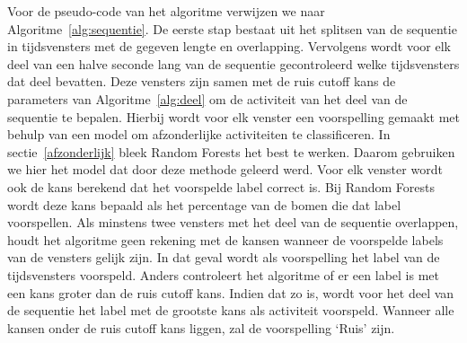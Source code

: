 \documentclass{article}
\begin{document}
Voor de pseudo-code van het algoritme verwijzen we naar Algoritme~\ref{alg:sequentie}. De eerste stap bestaat uit het splitsen van de sequentie in tijdsvensters met de gegeven lengte en overlapping. Vervolgens wordt voor elk deel van een halve seconde lang van de sequentie gecontroleerd welke tijdsvensters dat deel bevatten. Deze vensters zijn samen met de ruis cutoff kans de parameters van Algoritme~\ref{alg:deel} om de activiteit van het deel van de sequentie te bepalen. Hierbij wordt voor elk venster een voorspelling gemaakt met behulp van een model om afzonderlijke activiteiten te classificeren. In sectie~\ref{afzonderlijk} bleek Random Forests het best te werken. Daarom gebruiken we hier het model dat door deze methode geleerd werd. Voor elk venster wordt ook de kans berekend dat het voorspelde label correct is. Bij Random Forests wordt deze kans bepaald als het percentage van de bomen die dat label voorspellen.
Als minstens twee vensters met het deel van de sequentie overlappen, houdt het algoritme geen rekening met de kansen wanneer de voorspelde labels van de vensters gelijk zijn. In dat geval wordt als voorspelling het label van de tijdsvensters voorspeld. Anders controleert het algoritme of er een label is met een kans groter dan de ruis cutoff kans. Indien dat zo is, wordt voor het deel van de sequentie het label met de grootste kans als activiteit voorspeld. Wanneer alle kansen onder de ruis cutoff kans liggen, zal de voorspelling `Ruis' zijn.
\end{document}
